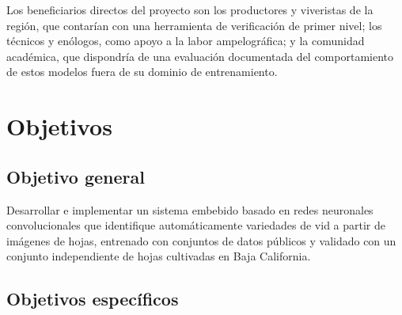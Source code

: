 Los beneficiarios directos del proyecto son los productores y viveristas de
la región, que contarían con una herramienta de verificación de primer
nivel; los técnicos y enólogos, como apoyo a la labor ampelográfica; y la
comunidad académica, que dispondría de una evaluación documentada del
comportamiento de estos modelos fuera de su dominio de entrenamiento.

\section{Objetivos}

\subsection{Objetivo general}

Desarrollar e implementar un sistema embebido basado en redes neuronales
convolucionales que identifique automáticamente variedades de vid a partir
de imágenes de hojas, entrenado con conjuntos de datos públicos y validado
con un conjunto independiente de hojas cultivadas en Baja California.

\subsection{Objetivos específicos}

